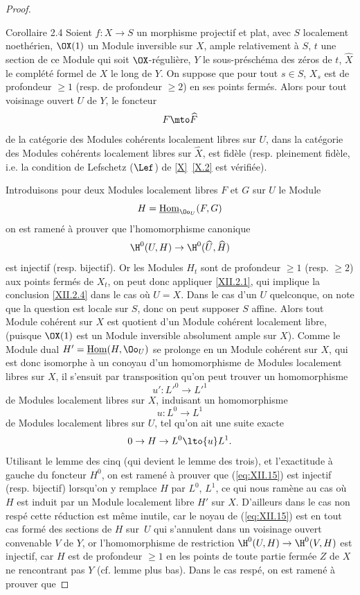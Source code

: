 \begin{proof}
\label{XII.2.4}
\begin{enonce*}{Corollaire 2.4\ndemark}
Soient $f:X\to S$ un morphisme projectif et plat, avec $S$ localement noeth\'erien, $\OX(1)$ un Module inversible sur $X$, ample relativement \`a $S$, $t$ une section de ce Module qui soit $\OX$-r\'eguli\`ere, $Y$ le sous-pr\'esch\'ema des z\'eros de $t$, $\widehat{X}$ le compl\'et\'e formel de $X$ le long de $Y$. On suppose que pour tout $s\in S$, $X_s$ est de profondeur $\geq 1$ (resp. de profondeur $\geq 2$) en ses points ferm\'es. Alors pour tout voisinage ouvert $U$ de $Y$, le foncteur
\[
F \mto \widehat{F}
\]
de la cat\'egorie des Modules coh\'erents localement libres sur $U$, dans la cat\'egorie des Modules coh\'erents localement libres sur $\widehat{X}$, est fid\`ele (resp. pleinement fid\`ele, i.e. la condition de Lefschetz ($\Lef$) de \ref{X}~\ref{X.2} est v\'erifi\'ee).
\end{enonce*}
Introduisons pour deux Modules localement libres $F$ et $G$ sur $U$ le Module
\[
H=\mathop{\underline{\mathrm{Hom}}}\nolimits_{\Oo_U}(F, G)
\]
on est ramen\'e \`a prouver que l'homomorphisme canonique
\steco
\begin{equation} \label{eq:XII.15} {}\H^0(U, H) \to \H^0(\widehat{U}, \widehat{H})
\end{equation}
est injectif (resp. bijectif). Or les Modules $H_t$ sont de profondeur $\geq 1$ (resp. $\geq 2$) aux points ferm\'es de $X_t$, on peut donc appliquer \ref{XII.2.1}, qui implique la conclusion \ref{XII.2.4} dans le cas o\`u $U=X$. Dans le cas d'un $U$ quelconque, on note que la question est locale sur $S$, donc on peut supposer $S$ affine. Alors tout Module coh\'erent sur $X$ est quotient d'un Module coh\'erent localement libre, (puisque $\OX(1)$ est un Module inversible absolument ample sur $X$). Comme le Module dual $H'=\mathop{\underline{\mathrm{Hom}}}\nolimits(H, \Oo_U)$ se prolonge en un Module coh\'erent sur $X$, qui est donc isomorphe \`a un conoyau d'un homomorphisme de Modules localement libres sur $X$, il s'ensuit par transposition qu'on peut trouver un homomorphisme
\[
u':{L'}^0 \to {L'}^1
\]
de Modules localement libres sur $X$, induisant un homomorphisme
\[
u:L^0 \to L^1
\]
de Modules localement libres sur $U$, tel qu'on ait une suite exacte
\[
0\to H \to L^0 \lto{u} L^1.
\]
Utilisant le lemme des cinq (qui devient le lemme des trois), et l'exactitude \`a gauche du foncteur $H^0$, on est ramen\'e \`a prouver que (\ref{eq:XII.15}) est injectif (resp. bijectif) lorsqu'on y remplace $H$ par $L^0$, $L^1$, ce qui nous ram\`ene au cas o\`u $H$ est induit par un Module localement libre $H'$ sur $X$. D'ailleurs dans le cas non resp\'e cette r\'eduction est m\^eme inutile, car le noyau de (\ref{eq:XII.15}) est en tout cas form\'e des sections de $H$ sur~$U$ qui s'annulent dans un voisinage ouvert convenable $V$ de $Y$, or l'homomorphisme de restriction $\H^0(U, H)\to\H^0(V, H)$ est injectif, car $H$ est de profondeur $\geq 1$ en les points de toute partie ferm\'ee $Z$ de $X$ ne rencontrant pas $Y$ (cf. lemme plus bas). Dans le cas resp\'e, on est ramen\'e \`a prouver que

\end{proof}

